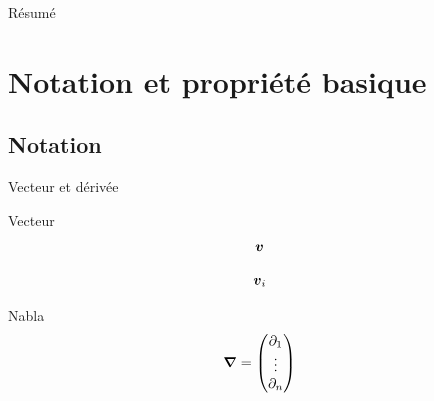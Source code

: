 \date[\today] %
{\today}

\subject{Navier-Stokes}





\setlength{\belowdisplayskip}{0pt}%
\setlength{\abovedisplayskip}{0pt}%
\begin{frame}
  \titlepage
\end{frame}

\begin{frame}[shrink]{Résumé}
  \tableofcontents[pausesections]
\end{frame}

\section{Notation et propriété basique}
\subsection{Notation}
\begin{frame}{Vecteur et dérivée}
 
 \begin{block}{Vecteur}
  \begin{equation*}
   {\boldsymbol {v}}
  \end{equation*}

  \begin{equation*}
   {\boldsymbol {v}}_{i}
  \end{equation*}

 \end{block}

\begin{block}{Nabla}
 \begin{equation*}
  {\boldsymbol {\nabla}}=\begin{pmatrix}
                 \partial_1\\
                 \vdots \\
                 \partial_n
                \end{pmatrix}
 \end{equation*}
\end{block}
\end{frame}


